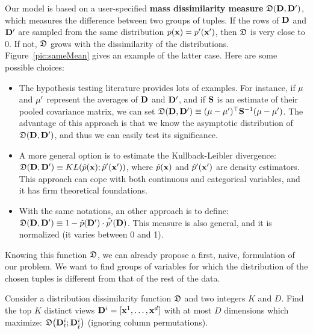 Our model is based on a user-specified \textbf{mass dissimilarity measure}
$\mathfrak{D}(\mathbf{D}, \mathbf{D}')$, which measures the difference between two groups of
tuples. If the rows of $\mathbf{D}$ and $\mathbf{D}'$ are sampled from the same
distribution $p(\mathbf{x}) = p'(\mathbf{x}')$, then $\mathfrak{D}$ is very close to 0. If
not, $\mathfrak{D}$ grows with the dissimilarity of the distributions.
Figure~\ref{pic:sameMean} gives an example of the latter case.  Here are some
possible choices:
\begin{itemize}
    \item The hypothesis testing literature provides lots of examples. For
        instance, if $\mathbf{\mu}$ and $\mathbf{\mu}'$ represent the averages of $\mathbf{D}$ and
        $\mathbf{D'}$, and if $\mathbf{S}$ is an estimate of their pooled covariance
        matrix, we can set $\mathfrak{D}(\mathbf{D}, \mathbf{D}') \equiv (\mathbf{\mu} -
        \mathbf{\mu'})^\top \mathbf{S}^{-1} ( \mathbf{\mu} -
        \mathbf{\mu'})$. The advantage of this approach is that we know the
        asymptotic distribution of $\mathfrak{D}(\mathbf{D}, \mathbf{D}')$, and thus we can
        easily test its significance.
    \item A more general option is to estimate the Kullback-Leibler divergence:
        $\mathfrak{D}(\mathbf{D}, \mathbf{D}') \equiv KL(\hat{p}(\mathbf{x});
        \hat{p}'(\mathbf{x}'))$, where $\hat{p}(\mathbf{x})$ and $\hat{p}'(\mathbf{x}')$
        are density estimators. This approach can cope with both continuous and
        categorical variables, and it has firm theoretical foundations.
    \item With the same notations, an other approach is to define:
        $\mathfrak{D}(\mathbf{D}, \mathbf{D}') \equiv 1 -  \hat{p}(\mathbf{D}') \cdot
        \hat{p'}(\mathbf{D})$. This measure is also general, and it is normalized
        (it varies between 0 and 1).
\end{itemize}
Knowing this function $\mathfrak{D}$, we can already propose a first, naive,
formulation of our problem. We want to find groups of variables for which the
distribution of the chosen tuples is different from that of the rest of the
data.
\begin{problem}
    Consider a distribution dissimilarity function $\mathfrak{D}$ and two integers
    $K$ and $D$. Find the top $K$ distinct views $\mathbf{D}^i = [\mathbf{x}^1, \dots,
    \mathbf{x}^d]$ with at most $D$ dimensions which maximize: $ \mathfrak{D}\big(
    \mathbf{D}^i_t ; \mathbf{D}^i_{\overline{t}} \big)$ (ignoring column permutations).
\end{problem}
